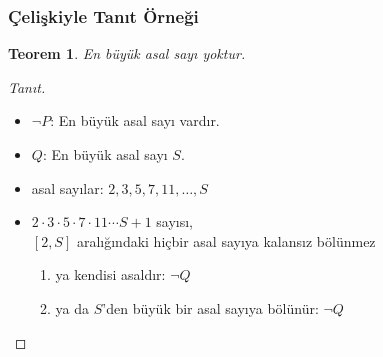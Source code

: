 \documentclass[dvipsnames]{beamer}
\theoremstyle{definition}
\theoremstyle{example}
\theoremstyle{plain}
\newtheorem{teorem}[theorem]{Teorem}
\begin{document}
\begin{frame}
  \frametitle{Çelişkiyle Tanıt Örneği}

  \begin{teorem}
    En büyük asal sayı yoktur.
  \end{teorem}

  \pause
  \begin{proof}[Tanıt]
    \begin{itemize}
      \item $\neg P$: En büyük asal sayı vardır.

      \pause
      \item $Q$: En büyük asal sayı $S$.

      \pause
      \item asal sayılar: $2,3,5,7,11,\dots,S$

      \pause
      \item $2 \cdot 3 \cdot 5 \cdot 7 \cdot 11 \cdots S + 1$ sayısı,\\
        $[2,S]$ aralığındaki hiçbir asal sayıya kalansız bölünmez

      \pause
      \begin{enumerate}
        \item ya kendisi asaldır: $\neg Q$

        \pause
        \item ya da $S$'den büyük bir asal sayıya bölünür: $\neg Q$
      \end{enumerate}
    \end{itemize}
  \end{proof}
\end{frame}
\end{document}
